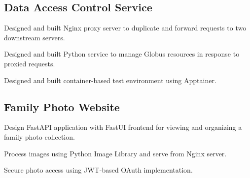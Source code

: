 \documentclass{article}
\begin{document}
\subsection{Data Access Control Service}
\begin{blacksquareitemize}
	\item Designed and built Nginx proxy server to duplicate and forward requests to two downstream servers.
    \item Designed and built Python service to manage Globus resources in response to proxied requests.
    \item Designed and built container-based test environment using Apptainer.
\end{blacksquareitemize}

\subsection{Family Photo Website}
\begin{blacksquareitemize}
    \item Design FastAPI application with FastUI frontend for viewing and organizing a family photo collection.
    \item Process images using Python Image Library and serve from Nginx server.
    \item Secure photo access using JWT-based OAuth implementation.
\end{blacksquareitemize}
\end{document}

